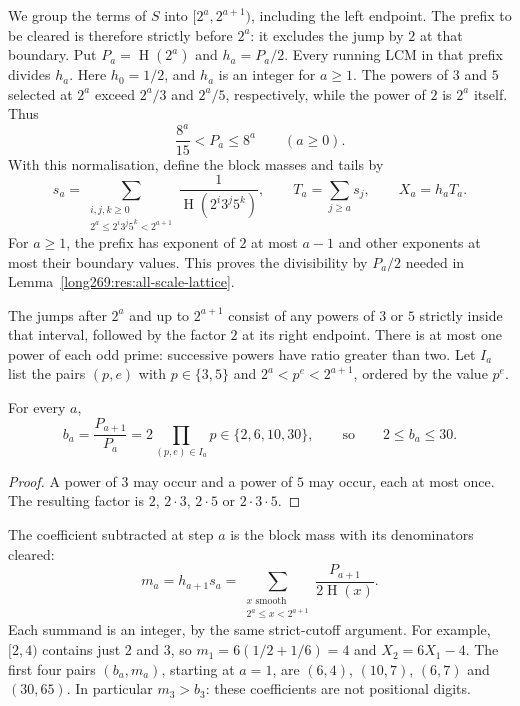 \documentclass[11pt]{article}
\theoremstyle{remark}
\theoremstyle{plain}
\newcommand{\hgt}{\operatorname{H}}
\begin{document}
We group the terms of $S$ into $[2^a,2^{a+1})$, including the left
endpoint. The prefix to be cleared is therefore strictly before $2^a$:
it excludes the jump by $2$ at that boundary. Put $P_a=\hgt(2^a)$ and
$h_a=P_a/2$. Every running LCM in that prefix divides $h_a$.
Here $h_0=1/2$, and $h_a$ is an integer for $a\ge1$.
The powers of $3$ and $5$ selected at $2^a$ exceed $2^a/3$ and $2^a/5$,
respectively, while the power of $2$ is $2^a$ itself. Thus
\[
 \frac{8^a}{15}<P_a\le8^a\qquad(a\ge0).
\]
With this normalisation, define the block masses and tails by
\begin{equation}\label{long269:eq:actual-tail}
 s_a=\sum_{\substack{i,j,k\ge0\\2^a\le2^i3^j5^k<2^{a+1}}}
         \frac1{\hgt(2^i3^j5^k)},\qquad
 T_a=\sum_{j\ge a}s_j,\qquad X_a=h_aT_a.
\end{equation}
For $a\ge1$, the prefix has exponent of $2$ at most $a-1$ and other
exponents at most their boundary values. This proves the divisibility
by $P_a/2$ needed in Lemma~\ref{long269:res:all-scale-lattice}.

The jumps after $2^a$ and up to $2^{a+1}$ consist of any powers of $3$ or
$5$ strictly inside that interval, followed by the factor $2$ at its right
endpoint.  There is at most one power of each odd prime: successive
powers have ratio greater than two.  Let $I_a$ list the pairs $(p,e)$ with
$p\in\{3,5\}$ and $2^a<p^e<2^{a+1}$, ordered by the value $p^e$.

\begin{proposition}\label{long269:res:dyadic-alphabet}
For every $a$,
\begin{equation}\label{long269:eq:dyadic-alphabet}
 b_a=\frac{P_{a+1}}{P_a}=2\prod_{(p,e)\in I_a}p\in\{2,6,10,30\},
 \qquad\text{so}\qquad 2\le b_a\le30 .
\end{equation}
\end{proposition}

\begin{proof}
A power of $3$ may occur and a power of $5$ may occur, each at most once.
The resulting factor is $2$, $2\cdot3$, $2\cdot5$ or $2\cdot3\cdot5$.
\end{proof}


The coefficient subtracted at step $a$ is the block mass with its
denominators cleared:
\[
 m_a=h_{a+1}s_a
 =\sum_{\substack{x\text{ smooth}\\2^a\le x<2^{a+1}}}
       \frac{P_{a+1}}{2\hgt(x)}.
\]
Each summand is an integer, by the same strict-cutoff argument.
For example, $[2,4)$ contains just $2$ and $3$, so
$m_1=6(1/2+1/6)=4$ and $X_2=6X_1-4$.
The first four pairs $(b_a,m_a)$, starting at $a=1$, are
$(6,4)$, $(10,7)$, $(6,7)$ and $(30,65)$.
In particular $m_3>b_3$: these coefficients are not positional digits.
\end{document}
